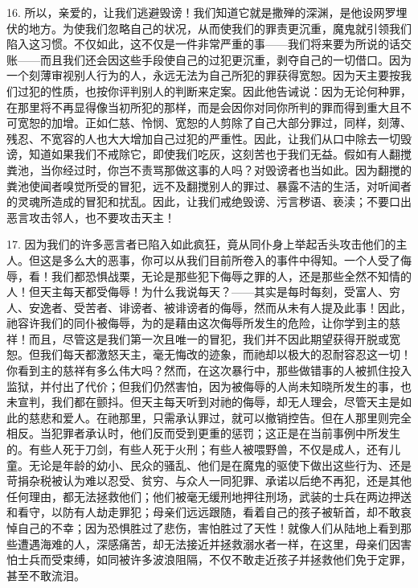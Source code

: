 16. 所以，亲爱的，让我们逃避毁谤！我们知道它就是撒殚的深渊，是他设网罗埋伏的地方。为使我们忽略自己的状况，从而使我们的罪责更沉重，魔鬼就引领我们陷入这习惯。不仅如此，这不仅是一件非常严重的事——我们将来要为所说的话交账——而且我们还会因这些手段使自己的过犯更沉重，剥夺自己的一切借口。因为一个刻薄审视别人行为的人，永远无法为自己所犯的罪获得宽恕。因为天主要按我们过犯的性质，也按你评判别人的判断来定案。因此他告诫说：因为无论何种罪，在那里将不再显得像当初所犯的那样，而是会因你对同你所判的罪而得到重大且不可宽恕的加增。正如仁慈、怜悯、宽恕的人剪除了自己大部分罪过，同样，刻薄、残忍、不宽容的人也大大增加自己过犯的严重性。因此，让我们从口中除去一切毁谤，知道如果我们不戒除它，即使我们吃灰，这刻苦也于我们无益。假如有人翻搅粪池，当你经过时，你岂不责骂那做这事的人吗？对毁谤者也当如此。因为翻搅的粪池使闻者嗅觉所受的冒犯，远不及翻搅别人的罪过、暴露不洁的生活，对听闻者的灵魂所造成的冒犯和扰乱。因此，让我们戒绝毁谤、污言秽语、亵渎；不要口出恶言攻击邻人，也不要攻击天主！\par

17. 因为我们的许多恶言者已陷入如此疯狂，竟从同仆身上举起舌头攻击他们的主人。但这是多么大的恶事，你可以从我们目前所卷入的事件中得知。一个人受了侮辱，看！我们都恐惧战栗，无论是那些犯下侮辱之罪的人，还是那些全然不知情的人！但天主每天都受侮辱！为什么我说每天？——其实是每时每刻，受富人、穷人、安逸者、受苦者、诽谤者、被诽谤者的侮辱，然而从未有人提及此事！因此，祂容许我们的同仆被侮辱，为的是藉由这次侮辱所发生的危险，让你学到主的慈祥！而且，尽管这是我们第一次且唯一的冒犯，我们并不因此期望获得开脱或宽恕。但我们每天都激怒天主，毫无悔改的迹象，而祂却以极大的忍耐容忍这一切！你看到主的慈祥有多么伟大吗？然而，在这次暴行中，那些做错事的人被抓住投入监狱，并付出了代价；但我们仍然害怕，因为被侮辱的人尚未知晓所发生的事，也未宣判，我们都在颤抖。但天主每天听到对祂的侮辱，却无人理会，尽管天主是如此的慈悲和爱人。在祂那里，只需承认罪过，就可以撤销控告。但在人那里则完全相反。当犯罪者承认时，他们反而受到更重的惩罚；这正是在当前事例中所发生的。有些人死于刀剑，有些人死于火刑；有些人被喂野兽，不仅是成人，还有儿童。无论是年龄的幼小、民众的骚乱、他们是在魔鬼的驱使下做出这些行为、还是苛捐杂税被认为难以忍受、贫穷、与众人一同犯罪、承诺以后绝不再犯，还是其他任何理由，都无法拯救他们；他们被毫无缓刑地押往刑场，武装的士兵在两边押送和看守，以防有人劫走罪犯；母亲们远远跟随，看着自己的孩子被斩首，却不敢哀悼自己的不幸；因为恐惧胜过了悲伤，害怕胜过了天性！就像人们从陆地上看到那些遭遇海难的人，深感痛苦，却无法接近并拯救溺水者一样，在这里，母亲们因害怕士兵而受束缚，如同被许多波浪阻隔，不仅不敢走近孩子并拯救他们免于定罪，甚至不敢流泪。\par

